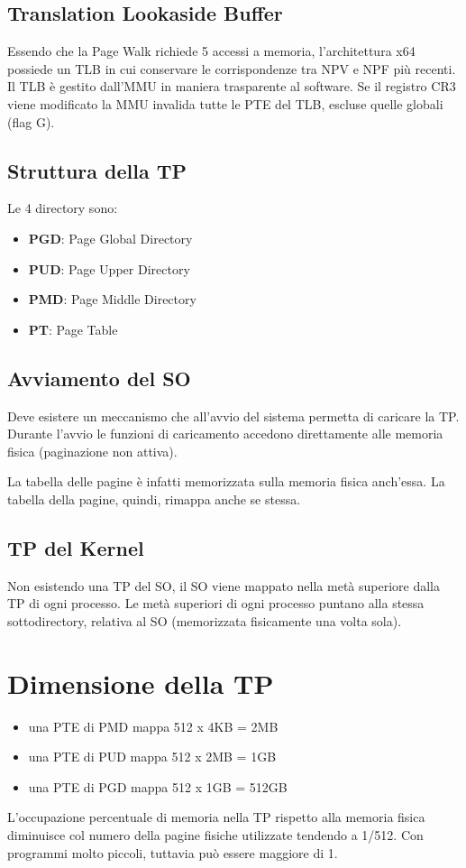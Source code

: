 \documentclass[12pt, a4paper]{report}
\begin{document}
\subsection{Translation Lookaside Buffer}
Essendo che la Page Walk richiede 5 accessi a memoria, l'architettura x64
possiede un TLB in cui conservare le corrispondenze tra NPV e NPF più
recenti. Il TLB è gestito dall'MMU in maniera trasparente al software.
Se il registro CR3 viene modificato la MMU invalida tutte le PTE del TLB,
escluse quelle globali (flag G).
\subsection{Struttura della TP}
Le 4 directory sono:
\begin{itemize}
	\item \textbf{PGD}: Page Global Directory
	\item \textbf{PUD}: Page Upper Directory
	\item \textbf{PMD}: Page Middle Directory
	\item \textbf{PT}: Page Table
\end{itemize}
\subsection{Avviamento del SO}
Deve esistere un meccanismo che all'avvio del sistema permetta di caricare la
TP. Durante l'avvio le funzioni di caricamento accedono direttamente alle
memoria fisica (paginazione non attiva).

La tabella delle pagine è infatti memorizzata sulla memoria fisica anch'essa.
La tabella della pagine, quindi, rimappa anche se stessa.
\subsection{TP del Kernel}
Non esistendo una TP del SO, il SO viene mappato nella metà superiore dalla TP
di ogni processo. Le metà superiori di ogni processo puntano alla stessa
sottodirectory, relativa al SO (memorizzata fisicamente una volta sola).

\section{Dimensione della TP}
\begin{itemize}
	\item una PTE di PMD mappa 512 x 4KB = 2MB
	\item una PTE di PUD mappa 512 x 2MB = 1GB
	\item una PTE di PGD mappa 512 x 1GB = 512GB
\end{itemize}
L'occupazione percentuale di memoria nella TP rispetto alla memoria fisica
diminuisce col numero della pagine fisiche utilizzate tendendo a 1/512. Con
programmi molto piccoli, tuttavia può essere maggiore di 1.
\end{document}
